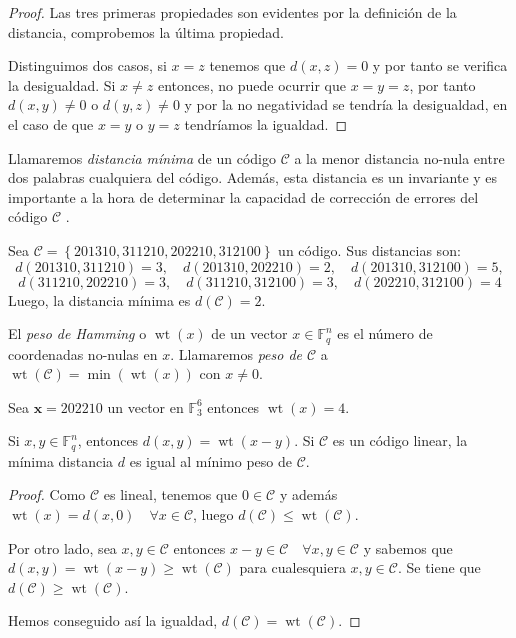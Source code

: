 \begin{proof}
Las tres primeras propiedades son evidentes por la definición de la distancia, comprobemos la última propiedad.

Distinguimos dos casos, si $ x = z $ tenemos que $d(x,z) = 0$ y por tanto se verifica la desigualdad. Si $x \neq z$ entonces, no puede ocurrir que $x = y = z $, por tanto $d(x,y) \neq 0$ o $d(y,z) \neq 0$ y por la no negatividad se tendría la desigualdad, en el caso de que $ x = y$ o $y = z$ tendríamos la igualdad.
\end{proof}

Llamaremos \textit{distancia mínima} de un código $\mathcal{C}$ a la menor distancia no-nula entre dos palabras cualquiera del código. Además, esta distancia es un invariante y es importante a la hora de determinar la capacidad de corrección de errores del código $\mathcal{C}$ .

\begin{exampleth}
Sea $\mathcal{C} = \left\{ 201310, 311210, 202210, 312100 \right\} $ un código. Sus distancias son:
\[
d(201310, 311210) = 3 , \quad d(201310,202210) = 2, \quad d(201310,312100) = 5,
\]
\[
 d(311210, 202210) = 3, \quad d(311210,312100) = 3, \quad d(202210,312100) = 4 
\]
Luego, la distancia mínima es $d(\mathcal{C}) = 2$.
\end{exampleth}

\begin{definition}
El \textit{peso de Hamming} o $\operatorname{wt}(x)$ de un vector $x \in \mathbb{F}_q^n$ es el número de coordenadas no-nulas en $x$. Llamaremos \textit{peso de $\mathcal{C}$} a 
$\operatorname{wt}(\mathcal{C}) = \min(\operatorname{wt}(x))$ con $x \neq 0 $.
\end{definition}

\begin{exampleth}
	Sea $\mathbf{x} = 202210$ un vector en $\mathbb{F}_3^6$ entonces $\operatorname{wt}(x) = 4$.
\end{exampleth}

\begin{theorem}
Si $x,y \in \mathbb{F}_q^n$, entonces $d(x,y) = \operatorname{wt}(x-y)$. Si $\mathcal{C}$ es un código linear, la mínima distancia $d$ es igual al mínimo peso de $\mathcal{C}$.
\end{theorem}

\begin{proof}
Como $\mathcal{C}$ es lineal, tenemos que $ 0 \in \mathcal{C}$ y además $\operatorname{wt}(x) = d(x,0) \quad \forall x \in \mathcal{C}$, luego $d(\mathcal{C}) \leq \operatorname{wt}(\mathcal{C})$.

Por otro lado, sea $x,y \in \mathcal{C}$ entonces $x-y \in \mathcal{C} \quad \forall x,y \in \mathcal{C}$ y sabemos que $d(x,y) = \operatorname{wt}(x-y) \geq \operatorname{wt}(\mathcal{C})$ para cualesquiera $x,y \in \mathcal{C}$. Se tiene que $d(\mathcal{C}) \geq \operatorname{wt}(\mathcal{C})$.

Hemos conseguido así la igualdad, $d(\mathcal{C}) = \operatorname{wt}(\mathcal{C})$.
\end{proof}

